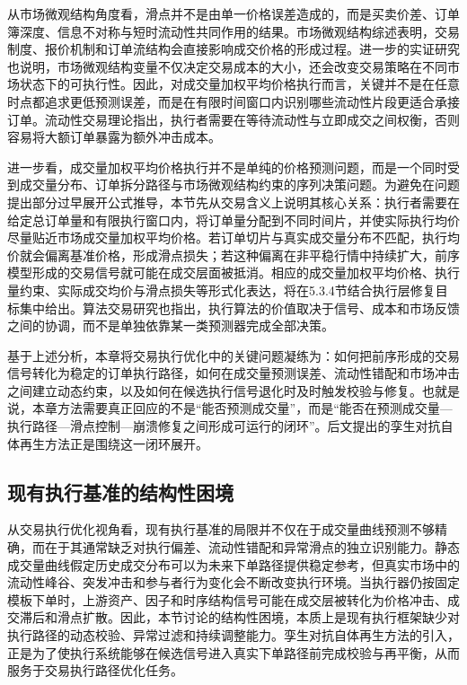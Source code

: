 从市场微观结构角度看，滑点并不是由单一价格误差造成的，而是买卖价差、订单簿深度、信息不对称与短时流动性共同作用的结果。市场微观结构综述表明，交易制度、报价机制和订单流结构会直接影响成交价格的形成过程\cite{Ananth2000Market}。进一步的实证研究也说明，市场微观结构变量不仅决定交易成本的大小，还会改变交易策略在不同市场状态下的可执行性\cite{hasbrouck2007empirical}。因此，对成交量加权平均价格执行而言，关键并不是在任意时点都追求更低预测误差，而是在有限时间窗口内识别哪些流动性片段更适合承接订单。流动性交易理论指出，执行者需要在等待流动性与立即成交之间权衡，否则容易将大额订单暴露为额外冲击成本\cite{huberman2005optimal}。

进一步看，成交量加权平均价格执行并不是单纯的价格预测问题，而是一个同时受到成交量分布、订单拆分路径与市场微观结构约束的序列决策问题。为避免在问题提出部分过早展开公式推导，本节先从交易含义上说明其核心关系：执行者需要在给定总订单量和有限执行窗口内，将订单量分配到不同时间片，并使实际执行均价尽量贴近市场成交量加权平均价格。若订单切片与真实成交量分布不匹配，执行均价就会偏离基准价格，形成滑点损失；若这种偏离在非平稳行情中持续扩大，前序模型形成的交易信号就可能在成交层面被抵消。相应的成交量加权平均价格、执行量约束、实际成交均价与滑点损失等形式化表达，将在5.3.4节结合执行层修复目标集中给出。算法交易研究也指出，执行算法的价值取决于信号、成本和市场反馈之间的协调，而不是单独依靠某一类预测器完成全部决策\cite{2014Algorithmic}。

基于上述分析，本章将交易执行优化中的关键问题凝练为：如何把前序形成的交易信号转化为稳定的订单执行路径，如何在成交量预测误差、流动性错配和市场冲击之间建立动态约束，以及如何在候选执行信号退化时及时触发校验与修复。也就是说，本章方法需要真正回应的不是“能否预测成交量”，而是“能否在预测成交量—执行路径—滑点控制—崩溃修复之间形成可运行的闭环”。后文提出的孪生对抗自体再生方法正是围绕这一闭环展开。

\subsection{现有执行基准的结构性困境}

从交易执行优化视角看，现有执行基准的局限并不仅在于成交量曲线预测不够精确，而在于其通常缺乏对执行偏差、流动性错配和异常滑点的独立识别能力。静态成交量曲线假定历史成交分布可以为未来下单路径提供稳定参考，但真实市场中的流动性峰谷、突发冲击和参与者行为变化会不断改变执行环境。当执行器仍按固定模板下单时，上游资产、因子和时序结构信号可能在成交层被转化为价格冲击、成交滞后和滑点扩散。因此，本节讨论的结构性困境，本质上是现有执行框架缺少对执行路径的动态校验、异常过滤和持续调整能力。孪生对抗自体再生方法的引入，正是为了使执行系统能够在候选信号进入真实下单路径前完成校验与再平衡，从而服务于交易执行路径优化任务。

